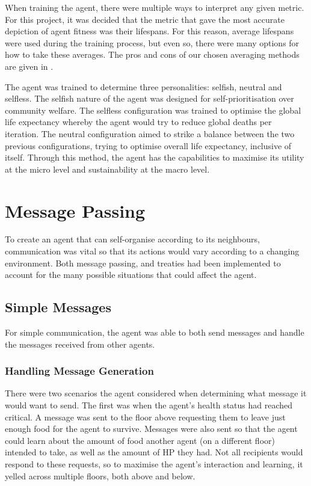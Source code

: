 When training the agent, there were multiple ways to interpret any given metric. For this project, it was decided that the metric that gave the most accurate depiction of agent fitness was their lifespans. For this reason, average lifespans were used during the training process, but even so, there were many options for how to take these averages. The pros and cons of our chosen averaging methods are given in .

The agent was trained to determine three personalities: selfish, neutral and selfless. The selfish nature of the agent was designed for self-prioritisation over community welfare. The selfless configuration was trained to optimise the global life expectancy whereby the agent would try to reduce global deaths per iteration. The neutral configuration aimed to strike a balance between the two previous configurations, trying to optimise overall life expectancy, inclusive of itself. Through this method, the agent has the capabilities to maximise its utility at the micro level and sustainability at the macro level.

\section{Message Passing}
To create an agent that can self-organise according to its neighbours, communication was vital so that its actions would vary according to a changing environment. Both message passing, and treaties had been implemented to account for the many possible situations that could affect the agent. 

\subsection{Simple Messages} \label{team4SimpleMessages}
For simple communication, the agent was able to both send messages and handle the messages received from other agents.

\subsubsection{Handling Message Generation}
There were two scenarios the agent considered when determining what message it would want to send. The first was when the agent’s health status had reached critical. A message was sent to the floor above requesting them to leave just enough food for the agent to survive. Messages were also sent so that the agent could learn about the amount of food another agent (on a different floor) intended to take, as well as the amount of HP they had. Not all recipients would respond to these requests, so to maximise the agent’s interaction and learning, it yelled across multiple floors, both above and below.

